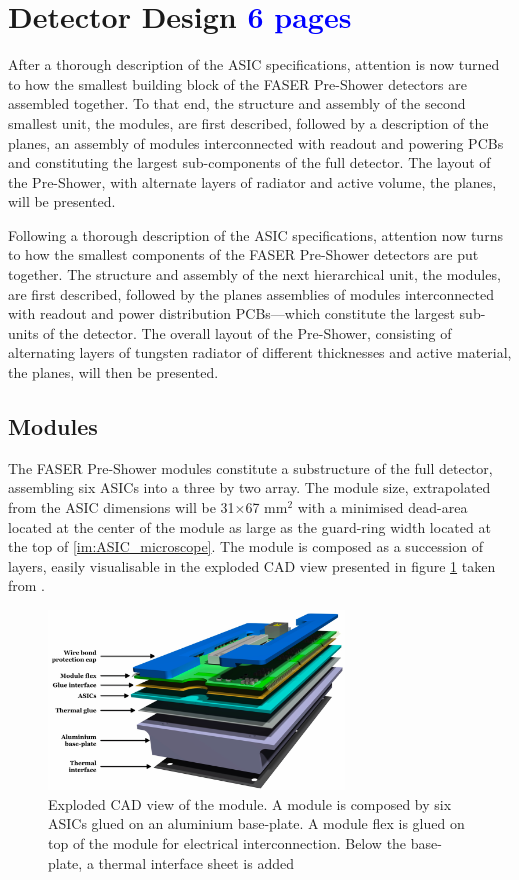 	\section{Detector Design \textcolor{blue}{ 6 pages}}
 	After a thorough description of the ASIC specifications,  attention is now turned to how the smallest building block of the FASER Pre-Shower detectors are assembled together. To that end, the structure and assembly of the second smallest unit, the modules, are first described, followed by a description of the planes, an assembly of modules interconnected with readout and powering PCBs and constituting the largest sub-components of the full detector. 
 	The layout of the Pre-Shower, with alternate layers of radiator and active volume, the planes, will be presented.
 	
 	Following a thorough description of the ASIC specifications, attention now turns to how the smallest components of the FASER Pre-Shower detectors are put together. The structure and assembly of the next hierarchical unit, the modules, are first described, followed by the planes assemblies of modules interconnected with readout and power distribution PCBs—which constitute the largest sub-units of the detector.
	The overall layout of the Pre-Shower, consisting of alternating layers of tungsten radiator of different thicknesses and active material, the planes, will then be presented.
 
		\subsection{Modules}
		
		The FASER Pre-Shower modules constitute a substructure of the full detector, assembling six ASICs into a three by two array. The module size, extrapolated from the ASIC dimensions will be 31$\times$67 mm$^2$ with a minimised dead-area located at the center of the module as large as the guard-ring width located at the top of \ref{im:ASIC_microscope}. The module is composed as a succession of layers, easily visualisable in the exploded CAD view presented in figure \ref{im:module_CAD} taken from \cite{PreShower_TP}.
		
		\begin{figure}[h]
			\centering
			\includegraphics[width=0.7\textwidth]{files/module_CAD}
			\caption{Exploded CAD view of the module. A module is composed by six ASICs glued on an aluminium base-plate. A module flex is glued on top of the module for electrical interconnection. Below the base-plate, a thermal interface sheet is added }
			\label{im:module_CAD}
		\end{figure}
		
